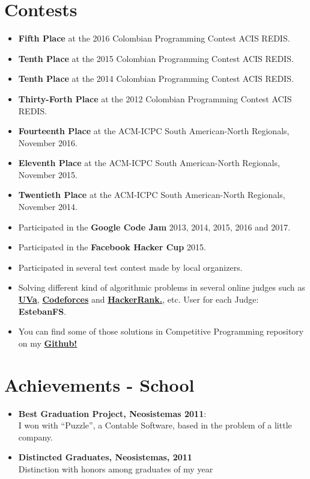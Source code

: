 \documentclass[a4paper,10pt]{article} %
\begin{document}
\section{Contests}
\begin{itemize}
 \item \textbf{Fifth Place} at the 2016 Colombian Programming Contest ACIS REDIS.
 \item \textbf{Tenth Place} at the 2015 Colombian Programming Contest ACIS REDIS.
 \item \textbf{Tenth Place} at the 2014 Colombian Programming Contest ACIS REDIS.
 \item \textbf{Thirty-Forth Place} at the 2012 Colombian Programming Contest ACIS REDIS.
 \item \textbf{Fourteenth Place} at the ACM-ICPC South American-North Regionals, November 2016.
 \item \textbf{Eleventh Place} at the ACM-ICPC South American-North Regionals, November 2015.
 \item \textbf{Twentieth Place} at the ACM-ICPC South American-North Regionals, November 2014.
 \item Participated in the \textbf{Google Code Jam} 2013, 2014, 2015, 2016 and 2017.
 \item Participated in the \textbf{Facebook Hacker Cup} 2015.
 \item Participated in several test contest made by local organizers.
 \item Solving different kind of algorithmic problems in several online judges such as
\href{http://uhunt.felix-halim.net/id/152728}{\textbf{UVa}}, \href{http://codeforces.com/profile/EstebanFS}{\textbf{Codeforces}} and \href{https://www.hackerrank.com/EstebanFS}{\textbf{HackerRank.}}, etc.
User for each Judge: \textbf{EstebanFS}.
\item You can find some of those solutions in Competitive Programming repository on my \href{https://github.com/EstebanFS/Competitive-Programming}{\textbf{Github!}}
\end{itemize}


\section{Achievements - School}
\begin{itemize}
\item \textbf{Best Graduation Project, Neosistemas 2011}:\\
I won with ``Puzzle'', a Contable Software, based in the problem of a little company.
\item \textbf{Distincted Graduates, Neosistemas, 2011}\\
Distinction with honors among graduates of my year
\end{itemize}
\end{document}
